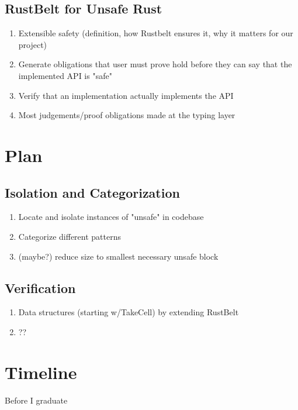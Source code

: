 \documentclass{article}
\begin{document}
\subsection{RustBelt for Unsafe Rust}
\begin{enumerate}
    \item Extensible safety (definition, how Rustbelt ensures it, why it matters for our project)
    \item Generate obligations that user must prove hold before they can say that the implemented API is "safe"
    \item Verify that an implementation actually implements the API
    \item Most judgements/proof obligations made at the typing layer
\end{enumerate}

\section{Plan}

\subsection{Isolation and Categorization}
\begin{enumerate}
    \item Locate and isolate instances of "unsafe" in codebase
    \item Categorize different patterns
    \item (maybe?) reduce size to smallest necessary unsafe block
\end{enumerate}

\subsection{Verification}
\begin{enumerate}
    \item Data structures (starting w/TakeCell) by extending RustBelt
    \item ??
\end{enumerate}

\section{Timeline}
Before I graduate
\end{document}
